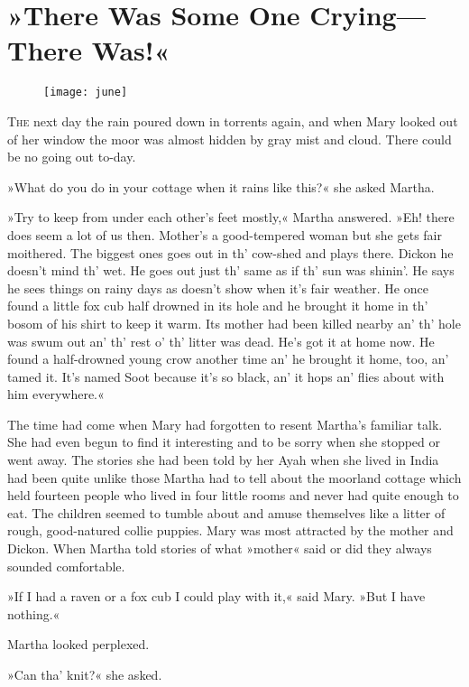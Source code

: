 \chapter{»There Was Some One Crying—There Was!«}
\begin{figure}[t!]
\centering
\texttt{[image: june]}
\end{figure}

	\lettrine[lines=6]{T}{he} next day the rain poured down in torrents again, and when Mary looked out of her window the moor was almost hidden by gray mist and cloud. There could be no going out to-day.

\zz
»What do you do in your cottage when it rains like this?« she asked Martha.

»Try to keep from under each other's feet mostly,« Martha answered. »Eh! there does seem a lot of us then. Mother's a good-tempered woman but she gets fair moithered. The biggest ones goes out in th' cow-shed and plays there. Dickon he doesn't mind th' wet. He goes out just th' same as if th' sun was shinin'. He says he sees things on rainy days as doesn't show when it's fair weather. He once found a little fox cub half drowned in its hole and he brought it home in th' bosom of his shirt to keep it warm. Its mother had been killed nearby an' th' hole was swum out an' th' rest o' th' litter was dead. He's got it at home now. He found a half-drowned young crow another time an' he brought it home, too, an' tamed it. It's named Soot because it's so black, an' it hops an' flies about with him everywhere.«

The time had come when Mary had forgotten to resent Martha's familiar talk. She had even begun to find it interesting and to be sorry when she stopped or went away. The stories she had been told by her Ayah when she lived in India had been quite unlike those Martha had to tell about the moorland cottage which held fourteen people who lived in four little rooms and never had quite enough to eat. The children seemed to tumble about and amuse themselves like a litter of rough, good-natured collie puppies. Mary was most attracted by the mother and Dickon. When Martha told stories of what »mother« said or did they always sounded comfortable.

»If I had a raven or a fox cub I could play with it,« said Mary. »But I have nothing.«

Martha looked perplexed.

»Can tha' knit?« she asked.

